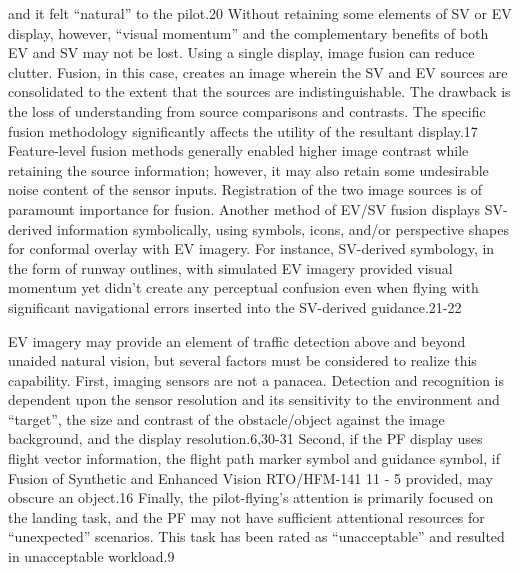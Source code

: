 \documentclass[utf8,bachelor,manualbib]{gradu3}
\begin{document}
and it felt “natural” to the pilot.20 Without retaining some elements of SV or EV display, however,
“visual momentum” and the complementary benefits of both EV and SV may not be lost.
Using a single display, image fusion can reduce clutter. Fusion, in this case, creates an image wherein the SV
and EV sources are consolidated to the extent that the sources are indistinguishable. The drawback is the loss
of understanding from source comparisons and contrasts. The specific fusion methodology significantly
affects the utility of the resultant display.17 Feature-level fusion methods generally enabled higher image
contrast while retaining the source information; however, it may also retain some undesirable noise content of
the sensor inputs. Registration of the two image sources is of paramount importance for fusion.
Another method of EV/SV fusion displays SV-derived information symbolically, using symbols, icons, and/or
perspective shapes for conformal overlay with EV imagery. For instance, SV-derived symbology, in the form
of runway outlines, with simulated EV imagery provided visual momentum yet didn’t create any perceptual
confusion even when flying with significant navigational errors inserted into the SV-derived guidance.21-22 \citep{baileyym2007}

EV imagery may provide an element of traffic detection above and beyond unaided natural vision, but several
factors must be considered to realize this capability. First, imaging sensors are not a panacea. Detection and
recognition is dependent upon the sensor resolution and its sensitivity to the environment and “target”, the
size and contrast of the obstacle/object against the image background, and the display resolution.6,30-31 Second,
if the PF display uses flight vector information, the flight path marker symbol and guidance symbol, if
Fusion of Synthetic and Enhanced Vision
RTO/HFM-141 11 - 5
provided, may obscure an object.16 Finally, the pilot-flying’s attention is primarily focused on the landing
task, and the PF may not have sufficient attentional resources for “unexpected” scenarios. This task has been
rated as “unacceptable” and resulted in unacceptable workload.9 \citep{baileyym2007}
\end{document}

